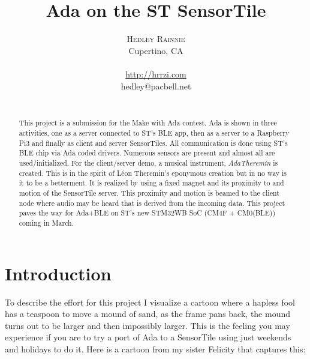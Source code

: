\documentclass[11pt]{article}
\title{Ada on the ST SensorTile}
\author{
  \textsc{Hedley Rainnie}
  \mbox{}\\ %
  Cupertino, CA\\
  \\
  \url{http://hrrzi.com}\\
  hedley@pacbell.net\\
  \mbox{}\\ %
}
\numberwithin{figure}{section}
\begin{document}
\maketitle

\begin{abstract}
This project is a submission for the Make with Ada contest. Ada is
shown in three activities, one as a server connected to ST's BLE app,
then as a server to a Raspberry Pi3 and finally as client and server
SensorTiles. All communication is done using ST's BLE chip via Ada
coded drivers. Numerous sensors are present and almost all are
used/initialized. For the client/server demo, a musical instrument,
\textit{AdaTheremin} is created. This is in the spirit of L\'eon
Theremin's eponymous creation but in no way is it to be a betterment.
It is realized by using a fixed magnet and its proximity to and motion
of the SensorTile server. This proximity and motion is beamed to the
client node where audio may be heard that is derived from the incoming
data. This project paves the way for Ada+BLE on ST's new STM32WB SoC
(CM4F + CM0(BLE)) coming in March.
\end{abstract}

\section{Introduction}
To describe the effort for this project I visualize a cartoon where a
hapless fool has a teaspoon to move a mound of sand, as the frame pans
back, the mound turns out to be larger and then impossibly
larger. This is the feeling you may experience if you are to try a
port of Ada to a SensorTile using just weekends and holidays to do
it. Here is a cartoon from my sister Felicity that captures this:
\end{document}
